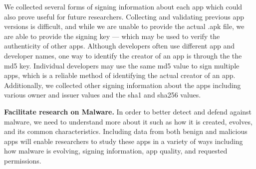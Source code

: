 \documentclass{sig-alternate-05-2015}
\begin{document}


We collected several forms of signing information about each app which could also prove useful for future researchers. Collecting and validating previous app versions is difficult, and while we are unable to provide the actual .apk file, we are able to provide the signing key --- which may be used to verify the authenticity of other apps. Although developers often use different app and developer names, one way to identify the creator of an app is through the the md5 key. Individual developers may use the same md5 value to sign multiple apps, which is a reliable method of identifying the actual creator of an app. Additionally, we collected  other signing information about the apps including various owner and issuer values and the sha1 and sha256 values.


 \textbf{Facilitate research on Malware.}
 In order to better detect and defend against malware, we need to understand more about it such as how it is created, evolves, and its common characteristics. Including data from both benign and malicious apps will enable researchers to study these apps in a variety of ways including how malware is evolving, signing information, app quality, and requested permissions.




%


%
%
%





\end{document}
